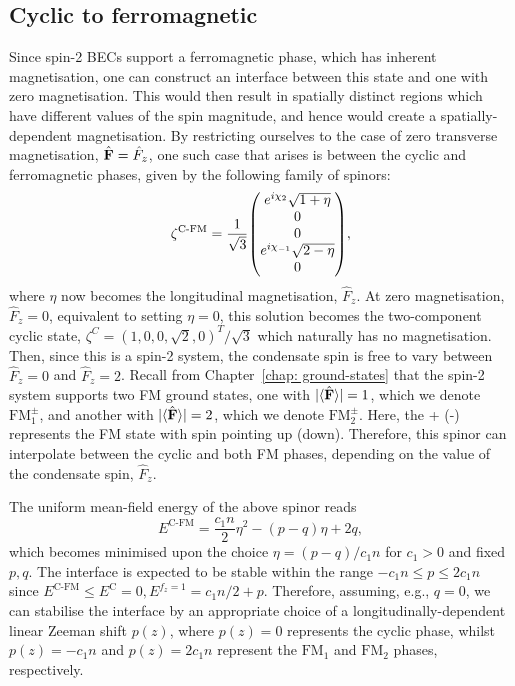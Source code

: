 \subsection{Cyclic to ferromagnetic}
Since spin-2 BECs support a ferromagnetic phase, which has inherent
magnetisation, one can construct an interface between this state and
one with zero magnetisation.
This would then result in spatially distinct regions which have different values
of the spin magnitude, and hence would create a spatially-dependent
magnetisation.
By restricting ourselves to the case of zero transverse magnetisation,
\(\hat{\vb{F}} = \hat{F}_z\), one such case that arises is between the cyclic
and ferromagnetic phases, given by the following family of spinors:
\begin{align}\label{eq: C-FM-interpolating-spinor}
    \zeta^\text{C-FM} = \frac{1}{\sqrt{3}}\mqty(
        e^{i\chi_2}\sqrt{1 + \eta} \\
        0 \\
        0 \\
        e^{i\chi_{-1}}\sqrt{2 - \eta} \\
        0
    ),
\end{align}
where \(\eta \) now becomes the longitudinal magnetisation, \(\hat{F}_z\).
At zero magnetisation, \(\hat{F}_z = 0\), equivalent to setting \(\eta=0\), this
solution becomes the two-component cyclic state,
\(\zeta^C = {(1, 0, 0, \sqrt{2}, 0)}^T/\sqrt{3}\) which naturally has no
magnetisation.
Then, since this is a spin-2 system, the condensate spin is free to vary between
\(\hat{F}_z = 0\) and \(\hat{F}_z = 2\).
Recall from Chapter~\ref{chap: ground-states} that the spin-2 system supports
two FM ground states, one with \(|\langle \hat{\vb{F}} \rangle | = 1\), which we denote
\(\text{FM}_1^\pm\), and another with \(|\langle \hat{\vb{F}} \rangle | = 2\), which we denote
\(\text{FM}_2^\pm\).
Here, the + (-) represents the FM state with spin pointing up (down).
Therefore, this spinor can interpolate between the cyclic and both FM phases,
depending on the value of the condensate spin, \(\hat{F}_z\).

The uniform mean-field energy of the above spinor reads
\begin{equation}
    E^\text{C-FM} = \frac{c_1 n}{2} \eta^2 - (p-q)\eta + 2q,
\end{equation}
which becomes minimised upon the choice \(\eta = (p-q)/c_1n\) for \(c_1 > 0\)
and fixed \(p, q\).
The interface is expected to be stable within the range
\(-c_1n \leq p \leq 2c_1n\) since \(E^\text{C-FM} \leq
E^\text{C}=0, E^{f_z=1} = c_1n/2 + p\).
Therefore, assuming, e.g., \(q=0\), we can stabilise the interface by an
appropriate choice of a longitudinally-dependent linear Zeeman shift \(p(z)\),
where \(p(z) = 0\) represents the cyclic phase, whilst \(p(z) = -c_1n\) and
\(p(z) = 2c_1n\) represent the \(\text{FM}_1\) and \(\text{FM}_2\) phases,
respectively.

